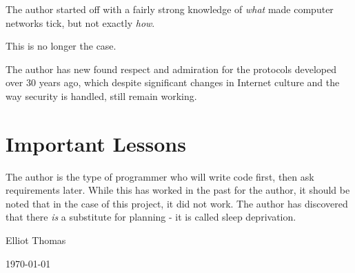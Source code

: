 \documentclass[10pt,a4paper,notitlepage]{report}
\begin{document}
The author started off with a fairly strong knowledge of \emph{what} made computer networks tick, but not exactly \emph{how}.

This is no longer the case.

The author has new found respect and admiration for the protocols developed over 30 years ago, which despite significant changes in Internet culture and the way security is handled, still remain working.

\section{Important Lessons}
The author is the type of programmer who will write code first, then ask requirements later. While this has worked in the past for the author, it should be noted that in the case of this project, it did not work. The author has discovered that there \emph{is} a substitute for planning - it is called sleep deprivation.

\begin{center}
Elliot Thomas

\today
\end{center}

\end{document}
